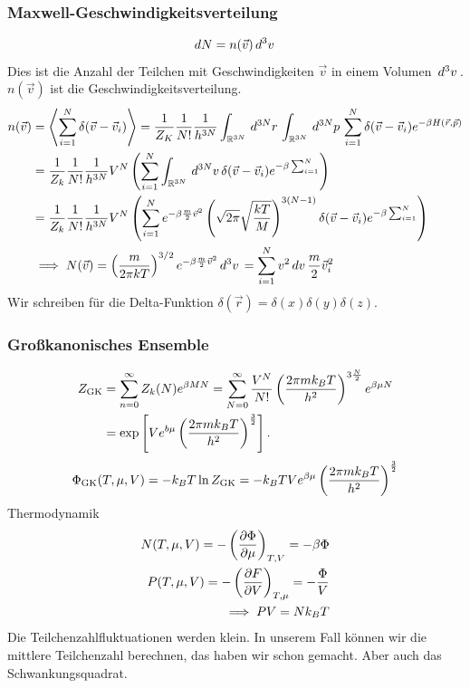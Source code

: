 \subsubsection*{Maxwell-Geschwindigkeitsverteilung}
%
\begin{align*}
  dN = n(\vec{v}) \,d^3 v\,
\end{align*}
%
Dies ist die Anzahl der Teilchen mit Geschwindigkeiten $\vec{v}$
in einem Volumen $ \,d^3v \,$.
$n(\vec{v})$ ist die Geschwindigkeitsverteilung.
%
\begin{align*}
  n(\vec{v}) & = \Braket{ \sum_{i=1}^{ N } \delta(\vec{v} - \vec{v}_i)} 
              = \frac{1}{Z_K} \frac{1}{N!} \frac{1}{h^{3N}} 
  \int_{\mathbb{R}^{3N}}^{} \,d^{3N}r\,\int_{\mathbb{R}^{3N}}^{} \,d^{3N} p \,
  \sum_{i=1}^{N} \delta(\vec{v} - \vec{v}_i) e^{-\beta H (\vec{r}, \vec{p})} \\
  & = \frac{1}{Z_k} \frac{1}{N!} \frac{1}{h^{3N}} V^N 
  \left( 
    \sum_{i=1}^{N} \int_{\mathbb{R}^{3N}}^{} \,d^{3N}v\,
    \delta (\vec{v} - \vec{v}_i) e^{-\beta \sum_{i=1}^{N}  }
    \right) \\
  & = \frac{1}{Z_k} \frac{1}{N!} \frac{1}{h^{3N}} V^N
  \left(   \sum_{i=1}^{N} e^{-\beta \frac{m}{2} \vec{v}^2}
    \left( \sqrt{2 \pi} \sqrt{\frac{kT}{M}} \right)^{3(N-1)}
    \delta (\vec{v} - \vec{v}_i) e ^{-\beta \sum_{i=1}^{N}} \right) \\
     & \implies N(\vec{v})  = \left( \frac{m}{2 \pi k T} \right) ^{3/2}
      e^{-\beta \frac{m}{2} \vec{v}^2}
      \,d^3 v\,  = \sum_{i=1}^{N} v^2 \,dv\,
  \frac{m}{2} \vec{v}_i^2 
\end{align*}
%
Wir schreiben f\"ur die Delta-Funktion $\delta(\vec{r}) = \delta(x) \delta(y)
\delta(z)$.

\subsubsection*{Gro\ss{}kanonisches Ensemble}
%
\begin{align*}
  Z_{\text{GK}} & = \sum_{n=0}^{\infty} Z_k (N) e^{ \beta M N} = 
  \sum_{N=0}^{\infty} \frac{V^N}{N!} \left( \frac{2 \pi m k_B T}{h^2} \right) 
  ^{3 \frac{N}{2}} e^{\beta \mu N} \\
& = \exp\left[ V e^{b \mu} \left(  \frac{2 \pi m k_B T}{ h^2} \right)^{\frac{3}{2}} \right].
\end{align*}
%
%
\begin{align*}
  \Phi_{\text{GK}} (T, \mu, V) = -k_B T \ln{Z_{\text{GK}}} = -k_B T V e^{\beta \mu}
  \left( \frac{2 \pi m k_B T}{ h^2} \right)^{\frac{3}{2}}
\end{align*}
%
Thermodynamik
%
\begin{align*}
  N(T, \mu, V) = - \left( \frac{\partial \Phi }{\partial \mu} \right)_{T,V} = 
  - \beta \Phi \\
  P(T, \mu, V) = - \left( \frac{\partial F }{\partial V} \right)_{T, \mu} = 
  - \frac{\Phi}{V} \\
  \implies PV = N k_B T 
\end{align*}
%
Die Teilchenzahlfluktuationen werden klein. In unserem Fall k\"onnen
wir die mittlere Teilchenzahl berechnen, das haben wir schon gemacht.
Aber auch das Schwankungsquadrat.
